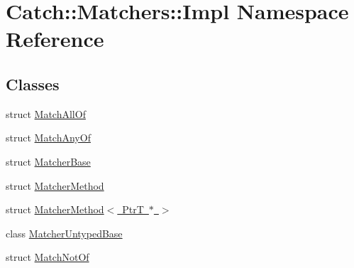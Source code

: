 \hypertarget{namespace_catch_1_1_matchers_1_1_impl}{}\section{Catch\+:\+:Matchers\+:\+:Impl Namespace Reference}
\label{namespace_catch_1_1_matchers_1_1_impl}
\subsection*{Classes}
\begin{DoxyCompactItemize}
\item 
struct \mbox{\hyperlink{struct_catch_1_1_matchers_1_1_impl_1_1_match_all_of}{Match\+All\+Of}}
\item 
struct \mbox{\hyperlink{struct_catch_1_1_matchers_1_1_impl_1_1_match_any_of}{Match\+Any\+Of}}
\item 
struct \mbox{\hyperlink{struct_catch_1_1_matchers_1_1_impl_1_1_matcher_base}{Matcher\+Base}}
\item 
struct \mbox{\hyperlink{struct_catch_1_1_matchers_1_1_impl_1_1_matcher_method}{Matcher\+Method}}
\item 
struct \mbox{\hyperlink{struct_catch_1_1_matchers_1_1_impl_1_1_matcher_method_3_01_ptr_t_01_5_01_4}{Matcher\+Method$<$ Ptr\+T $\ast$ $>$}}
\item 
class \mbox{\hyperlink{class_catch_1_1_matchers_1_1_impl_1_1_matcher_untyped_base}{Matcher\+Untyped\+Base}}
\item 
struct \mbox{\hyperlink{struct_catch_1_1_matchers_1_1_impl_1_1_match_not_of}{Match\+Not\+Of}}
\end{DoxyCompactItemize}
